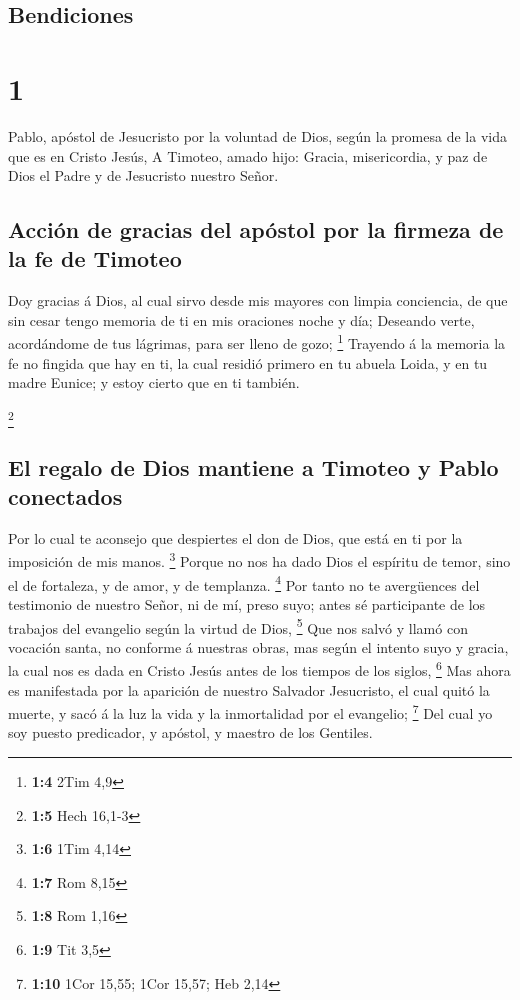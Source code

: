 \hypertarget{bendiciones}{%
\subsection{Bendiciones}\label{bendiciones}}

\hypertarget{section}{%
\section{1}\label{section}}

 Pablo, apóstol de Jesucristo por la voluntad de Dios, según
la promesa de la vida que es en Cristo Jesús,  A Timoteo,
amado hijo: Gracia, misericordia, y paz de Dios el Padre y de Jesucristo
nuestro Señor.

\hypertarget{acciuxf3n-de-gracias-del-apuxf3stol-por-la-firmeza-de-la-fe-de-timoteo}{%
\subsection{Acción de gracias del apóstol por la firmeza de la fe de
Timoteo}\label{acciuxf3n-de-gracias-del-apuxf3stol-por-la-firmeza-de-la-fe-de-timoteo}}

 Doy gracias á Dios, al cual sirvo desde mis mayores con
limpia conciencia, de que sin cesar tengo memoria de ti en mis oraciones
noche y día;  Deseando verte, acordándome de tus lágrimas,
para ser lleno de gozo; \footnote{\textbf{1:4} 2Tim 4,9} 
Trayendo á la memoria la fe no fingida que hay en ti, la cual residió
primero en tu abuela Loida, y en tu madre Eunice; y estoy cierto que en
ti también.

\footnote{\textbf{1:5} Hech 16,1-3}

\hypertarget{el-regalo-de-dios-mantiene-a-timoteo-y-pablo-conectados}{%
\subsection{El regalo de Dios mantiene a Timoteo y Pablo
conectados}\label{el-regalo-de-dios-mantiene-a-timoteo-y-pablo-conectados}}

 Por lo cual te aconsejo que despiertes el don de Dios, que
está en ti por la imposición de mis manos. \footnote{\textbf{1:6} 1Tim
  4,14}  Porque no nos ha dado Dios el espíritu de temor,
sino el de fortaleza, y de amor, y de templanza. \footnote{\textbf{1:7}
  Rom 8,15}  Por tanto no te avergüences del testimonio de
nuestro Señor, ni de mí, preso suyo; antes sé participante de los
trabajos del evangelio según la virtud de Dios, \footnote{\textbf{1:8}
  Rom 1,16}  Que nos salvó y llamó con vocación santa, no
conforme á nuestras obras, mas según el intento suyo y gracia, la cual
nos es dada en Cristo Jesús antes de los tiempos de los siglos,
\footnote{\textbf{1:9} Tit 3,5}  Mas ahora es manifestada
por la aparición de nuestro Salvador Jesucristo, el cual quitó la
muerte, y sacó á la luz la vida y la inmortalidad por el evangelio;
\footnote{\textbf{1:10} 1Cor 15,55; 1Cor 15,57; Heb 2,14} 
Del cual yo soy puesto predicador, y apóstol, y maestro de los Gentiles.

